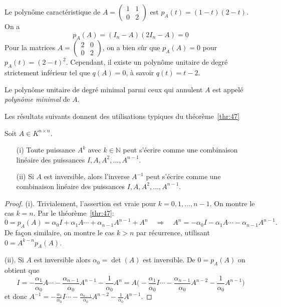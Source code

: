 \begin{example}
Le polyn\^ome caract\'eristique de $A = \left( \begin{array}{cc} 1 & 1 \\ 0 & 2
\end{array} \right)$ est $p_A(t) = (1-t)(2-t)$. On a 
\[
 p_A(A) = (I_n-A)(2I_n-A) = 0 
\]
Pour la matrices $A = \left( \begin{array}{cc} 2 & 0 \\ 0 & 2 \end{array}
\right)$, on a bien sûr que $p_A(A) = 0$ pour $p_A(t) = (2-t)^2$. Cependant, il existe un polyn\^ome unitaire de degr\'e strictement inférieur tel que $q(A) = 0$, à savoir $q(t) = t-2$. 

\begin{definition}
  \label{def:44}
  Le polyn\^ome unitaire de degr\'e minimal parmi ceux qui annulent $A$ est appelé \emph{polyn\^ome minimal} de $A$.
\end{definition}

\end{example}

Les résultats suivants donnent des utilisations typiques du théorème~\ref{thr:47}
\begin{corollary} Soit $A \in K^{n ×n}$.
\begin{enumerate}
\item[(i)] Toute puissance $A^k$ avec $k∈ℕ$ peut s'\'ecrire comme une combinaison lin\'eaire des puissances $I,A,A^2,\ldots,A^{n-1}$.
\item[(ii)] Si $A$ est inversible, alors l'inverse $A^{-1}$ peut s'\'ecrire comme une combinaison lin\'eaire des puissances $I,A,A^2,\ldots,A^{n-1}$.
\end{enumerate}
\end{corollary}

\begin{proof}
 (i). Trivialement, l'assertion est vraie pour $k = 0,1,\ldots,n-1$.
On montre le cas $k = n$. Par le théorème~\ref{thr:47}:
\[
 0 = p_A(A) = \alpha_0 I + \alpha_1 A  \cdots + \alpha_{n-1} A^{n-1} + A^n \quad
\Rightarrow \quad A^n = 
-\alpha_0 I - \alpha_1 A  \cdots - \alpha_{n-1} A^{n-1}.
\]
De fa\c{c}on similaire, on montre le cas $k>n$ par r\'ecurrence, utilisant $0 = A^{k-n} p_A(A)$.

(ii). Si $A$ est inversible alors $\alpha_0 = \det(A)$ est inversible. De $0 = p_A(A)$ on obtient que
\[
  I = -\frac{\alpha_1}{\alpha_0} A  \cdots -\frac{\alpha_{n-1}}{\alpha_0}
A^{n-1} -\frac{1}{\alpha_0} A^n = A \Big( -\frac{\alpha_1}{\alpha_0} I  \cdots
-\frac{\alpha_{n-1}}{\alpha_0} A^{n-2} -\frac{1}{\alpha_0} A^{n-1} \Big)
\]
et donc $A^{-1} = -\frac{\alpha_1}{\alpha_0} I  \cdots
-\frac{\alpha_{n-1}}{\alpha_0} A^{n-2} -\frac{1}{\alpha_0} A^{n-1}$.
\end{proof}



